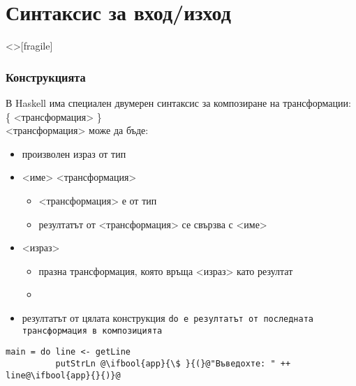 \documentclass[alsotrans,beameroptions={aspectratio=169}]{beamerswitch}
\begin{document}
\section{Синтаксис за вход/изход}

\begin{frame}<>[fragile]
  \frametitle{Конструкцията }

  В Haskell има специален \alert{двумерен} синтаксис за композиране на трансформации:\\[1ex]
   \{ <трансформация> \}\\[1ex]
  \pause
  <трансформация> може да бъде:
  \begin{itemize}[<+->]
  \item произволен израз от тип 
  \item{} <име> \tta{<-} <трансформация>
    \begin{itemize}
    \item{} <трансформация> е от тип 
    \item резултатът от <трансформация> се свързва с <име>
    \end{itemize}
  \item {} <израз>
    \begin{itemize}
    \item празна трансформация, която връща <израз> като резултат
    \item {}
    \end{itemize}
  \item резултатът от цялата конструкция \tt{do} е резултатът от последната трансформация в композицията
  \end{itemize}
  \onslide<+->
  \vspace{-.5ex}
\begin{lstlisting}
main = do line <- getLine
          putStrLn @\ifbool{app}{\$ }{(}@"Въведохте: " ++ line@\ifbool{app}{}{)}@
\end{lstlisting}
\end{frame}
\end{document}
